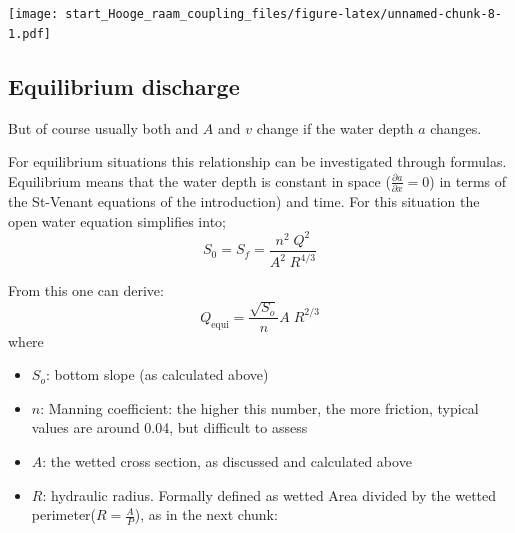 \documentclass[
]{article}
\begin{document}
\texttt{[image: start\_Hooge\_raam\_coupling\_files/figure-latex/unnamed-chunk-8-1.pdf]}

\hypertarget{equilibrium-discharge}{%
\subsection{Equilibrium discharge}\label{equilibrium-discharge}}

But of course usually both and \(A\) and \(v\) change if the water depth
\(a\) changes.

For equilibrium situations this relationship can be investigated through
formulas. Equilibrium means that the water depth is constant in space
(\(\frac{\partial a}{\partial x} = 0\)) in terms of the St-Venant
equations of the introduction) and time. For this situation the open
water equation simplifies into;
\[S_0 = S_f = \frac{n^2\; Q^2}{A^2\; R^{4/3}}\]

From this one can derive:
\[Q_\mathrm{equi} = \frac{\sqrt{S_o}}{n} A\; R^{2/3}\] where

\begin{itemize}
\item
  \(S_o\): bottom slope (as calculated above)
\item
  \(n\): Manning coefficient: the higher this number, the more friction,
  typical values are around 0.04, but difficult to assess
\item
  \(A\): the wetted cross section, as discussed and calculated above
\item
  \(R\): hydraulic radius. Formally defined as wetted Area divided by
  the wetted perimeter(\(R=\frac {A}{P}\)), as in the next chunk:
\end{itemize}
\end{document}

